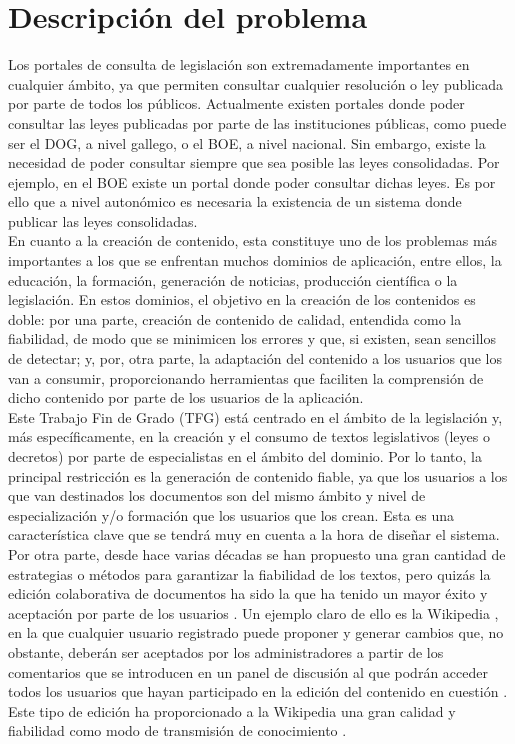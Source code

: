 \section{Descripción del problema}

Los portales de consulta de legislación son extremadamente importantes en cualquier ámbito, ya que permiten consultar cualquier resolución o ley publicada por parte de todos los públicos. Actualmente existen portales donde poder consultar las leyes publicadas por parte de las instituciones públicas, como puede ser el DOG, a nivel gallego, o el BOE, a nivel nacional. Sin embargo, existe la necesidad de poder consultar siempre que sea posible las leyes consolidadas. Por ejemplo, en el BOE existe un portal \cite{boe} donde poder consultar dichas leyes. Es por ello que a nivel autonómico es necesaria la existencia de un sistema donde publicar las leyes consolidadas.
\\

En cuanto a la creación de contenido, esta constituye uno de los problemas más importantes a los que se enfrentan muchos dominios de aplicación, entre ellos, la educación, la formación, generación de noticias, producción científica o la legislación. En estos dominios, el objetivo en la creación de los contenidos es doble: por una parte, creación de contenido de calidad, entendida como la fiabilidad, de modo que se minimicen los errores y que, si existen, sean sencillos de detectar; y, por, otra parte, la adaptación del contenido a los usuarios que los van a consumir, proporcionando herramientas que faciliten la comprensión de dicho contenido por parte de los usuarios de la aplicación.
\\

Este Trabajo Fin de Grado (TFG) está centrado en el ámbito de la legislación y, más específicamente, en la creación y el consumo de textos legislativos (leyes o decretos) por parte de especialistas en el ámbito del dominio. Por lo tanto, la principal restricción es la generación de contenido fiable, ya que los usuarios a los que van destinados los documentos son del mismo ámbito y nivel de especialización y/o formación que los usuarios que los crean. Esta es una característica clave que se tendrá muy en cuenta a la hora de diseñar el sistema.
\\

Por otra parte, desde hace varias décadas se han propuesto una gran cantidad de estrategias o métodos para garantizar la fiabilidad de los textos, pero quizás la edición colaborativa de documentos ha sido la que ha tenido un mayor éxito y aceptación por parte de los usuarios \cite{collaborative}. Un ejemplo claro de ello es la Wikipedia \cite{wikipedia}, en la que cualquier usuario registrado puede proponer y generar cambios que, no obstante, deberán ser aceptados por los administradores a partir de los comentarios que se introducen en un panel de discusión al que podrán acceder todos los usuarios que hayan participado en la edición del contenido en cuestión \cite{knowledge}. Este tipo de edición ha proporcionado a la Wikipedia una gran calidad y fiabilidad como modo de transmisión de conocimiento \cite{trustworthiness}.
\\

